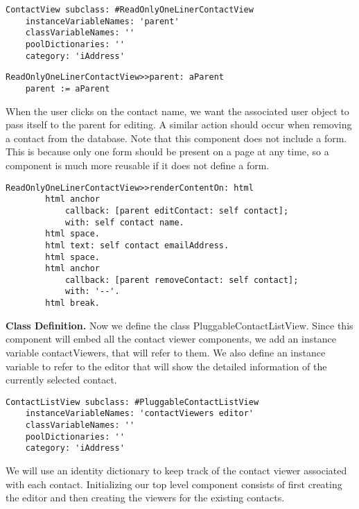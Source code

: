 \documentclass[a4paper,10pt,twoside]{book}
\newcommand{\ct}[1]{{\small\ttfamily\textup{#1}}}
\begin{document}
\begin{lstlisting}
ContactView subclass: #ReadOnlyOneLinerContactView
    instanceVariableNames: 'parent'
    classVariableNames: ''
    poolDictionaries: ''
    category: 'iAddress'
\end{lstlisting}

\begin{lstlisting}
ReadOnlyOneLinerContactView>>parent: aParent
    parent := aParent
\end{lstlisting}

When the user clicks on the contact name, we want the associated user object to pass itself to the parent for editing. A similar action should occur when removing a contact from the database. Note that this component does not include a form. This is because only one form should be present on a page at any time, so a component is much more reusable if it does not define a form.

\begin{lstlisting}
ReadOnlyOneLinerContactView>>renderContentOn: html
        html anchor
            callback: [parent editContact: self contact];
            with: self contact name.
        html space.
        html text: self contact emailAddress.
        html space.
        html anchor
            callback: [parent removeContact: self contact];
            with: '--'.
        html break.
\end{lstlisting}

\textbf{Class Definition.} Now we define the class \ct{PluggableContactListView}. Since this component will embed all the contact viewer components, we add an instance variable \ct{contactViewers}, that will refer to them. We also define an instance variable to refer to the editor that will show the detailed information of the currently selected contact.

\begin{lstlisting}
ContactListView subclass: #PluggableContactListView
    instanceVariableNames: 'contactViewers editor'
    classVariableNames: ''
    poolDictionaries: ''
    category: 'iAddress'
\end{lstlisting}

We will use an identity dictionary to keep track of the contact viewer associated with each contact. Initializing our top level component consists of first creating the editor and then creating the viewers for the existing contacts.
\end{document}
